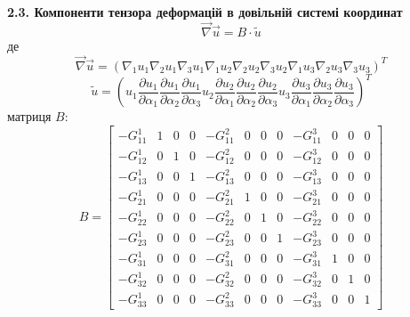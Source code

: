 \documentclass[10pt,a4paper]{article}
\numberwithin{figure}{section}
\numberwithin{equation}{section}
\begin{document}
\textbf{2.3. Компоненти тензора деформацій в довільній системі координат}
\begin{equation}
\vec{\nabla} \vec{u} =  
B \cdot \tilde{u}
\end{equation}
де \\
\begin{equation}
\vec{\nabla} \vec{u} =  \left(
\nabla_1 u_1  \nabla_2 u_1  \nabla_3 u_1 \nabla_1 u_2  \nabla_2 u_2  \nabla_3 u_2 
\nabla_1 u_3  \nabla_2 u_3  \nabla_3 u_3 
\right)^T
\end{equation}
\begin{equation}
 \tilde{u} =  \left( u_1 
\frac { \partial u_1 } { \partial \alpha_1} 
\frac { \partial u_1 } { \partial \alpha_2} 
\frac { \partial u_1 } { \partial \alpha_3} 
u_2 
\frac { \partial u_2 } { \partial \alpha_1} 
\frac { \partial u_2 } { \partial \alpha_2} 
\frac { \partial u_2 } { \partial \alpha_3} 
u_3 
\frac { \partial u_3 } { \partial \alpha_1} 
\frac { \partial u_3 } { \partial \alpha_2} 
\frac { \partial u_3 } { \partial \alpha_3} 
\right)^T
\end{equation}
матриця $B$:
\begin{equation}\label{eq:matrixB}
B=
\left[\begin{array}{cccccccccccc}
-G_{11}^1 & 1 & 0 & 0 & -G_{11}^2 & 0 & 0 & 0 & -G_{11}^3 & 0 & 0 & 0\\
-G_{12}^1 & 0 & 1 & 0 & -G_{12}^2 & 0 & 0 & 0 & -G_{12}^3 & 0 & 0 & 0\\
-G_{13}^1 & 0 & 0 & 1 & -G_{13}^2 & 0 & 0 & 0 & -G_{13}^3 & 0 & 0 & 0\\
-G_{21}^1 & 0 & 0 & 0 & -G_{21}^2 & 1 & 0 & 0 & -G_{21}^3 & 0 & 0 & 0\\
-G_{22}^1 & 0 & 0 & 0 & -G_{22}^2 & 0 & 1 & 0 & -G_{22}^3 & 0 & 0 & 0\\
-G_{23}^1 & 0 & 0 & 0 & -G_{23}^2 & 0 & 0 & 1 & -G_{23}^3 & 0 & 0 & 0\\
-G_{31}^1 & 0 & 0 & 0 & -G_{31}^2 & 0 & 0 & 0 & -G_{31}^3 & 1 & 0 & 0\\
-G_{32}^1 & 0 & 0 & 0 & -G_{32}^2 & 0 & 0 & 0 & -G_{32}^3 & 0 & 1 & 0\\
-G_{33}^1 & 0 & 0 & 0 & -G_{33}^2 & 0 & 0 & 0 & -G_{33}^3 & 0 & 0 & 1
\end{array}\right]
\end{equation}
\end{document}
